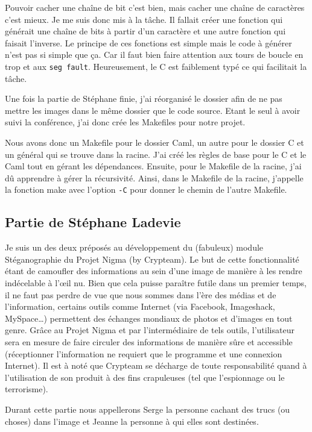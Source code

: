 \documentclass[a4paper,12pt]{article}
\begin{document}
Pouvoir cacher une chaîne de bit c'est bien, mais cacher une chaîne de caractères c'est mieux. Je me suis donc mis à la tâche. Il fallait créer une fonction qui générait une chaîne de bits à partir d'un caractère et une autre fonction qui faisait l'inverse. Le principe de ces fonctions est simple mais le code à générer n'est pas si simple que ça. Car il faut bien faire attention aux tours de boucle en trop et aux \texttt{seg fault}. Heureusement, le C est faiblement typé ce qui facilitait la tâche.

Une fois la partie de Stéphane finie, j'ai réorganisé le dossier afin de ne pas mettre les images dans le même dossier que le code source. Etant le seul à avoir suivi la conférence, j'ai donc crée les Makefiles pour notre projet.

Nous avons donc un Makefile pour le dossier Caml, un autre pour le dossier C et un général qui se trouve dans la racine. J'ai créé les règles de base pour le C et le Caml tout en gérant les dépendances. Ensuite, pour le Makefile de la racine, j'ai dû apprendre à gérer la récursivité. Ainsi, dans le Makefile de la racine, j'appelle la fonction make avec l'option \texttt{-C} pour donner le chemin de l'autre Makefile.

\newpage

\subsection{Partie de Stéphane Ladevie}

Je suis un des deux préposés au développement du (fabuleux) module Stéganographie  du Projet Nigma (by Crypteam). Le but de cette fonctionnalité étant de camoufler des informations au sein d'une image de manière à les rendre indécelable à l'\oe{}il nu.
Bien que cela puisse paraître futile dans un premier temps, il ne faut pas perdre de vue que nous sommes dans l'ère des médias et de l'information, certains outils comme Internet (via Facebook, Imageshack, MySpace\dots{}) permettent des échanges mondiaux de photos et d'images en tout genre. Grâce au Projet Nigma et par l'intermédiaire de tels outils, l'utilisateur sera en mesure de faire circuler des informations de manière sûre et accessible (réceptionner l'information ne requiert que le programme et une connexion Internet). Il est à noté que Crypteam se décharge de toute responsabilité quand à l'utilisation de son produit à des fins crapuleuses (tel que l'espionnage ou le terrorisme).

Durant cette partie nous appellerons Serge la personne cachant des trucs (ou choses) dans l'image et Jeanne la personne à qui elles sont destinées.
\end{document}
